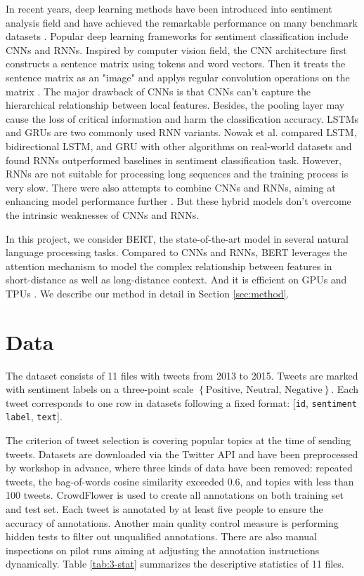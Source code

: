 \documentclass[runningheads]{llncs}
\begin{document}
In recent years, deep learning methods have been introduced into sentiment analysis field and have achieved the remarkable performance on many benchmark datasets \cite{2019sa}. Popular deep learning frameworks for sentiment classification include CNNs and RNNs. Inspired by computer vision field, the CNN architecture first constructs a sentence matrix using tokens and word vectors. Then it treats the sentence matrix as an "image" and applys regular convolution operations on the matrix \cite{cnns}. The major drawback of CNNs is that CNNs can't capture the hierarchical relationship between local features. Besides, the pooling layer may cause the loss of critical information and harm the classification accuracy. LSTMs and GRUs are two commonly used RNN variants. Nowak et al. \cite{rnns} compared LSTM, bidirectional LSTM, and GRU with other algorithms on real-world datasets and found RNNs outperformed baselines in sentiment classification task. However, RNNs are not suitable for processing long sequences and the training process is very slow. There were also attempts to combine CNNs and RNNs, aiming at enhancing model performance further \cite{com1}\cite{com2}. But these hybrid models don't overcome the intrinsic weaknesses of CNNs and RNNs.

In this project, we consider BERT, the state-of-the-art model in several natural language processing tasks. Compared to CNNs and RNNs, BERT leverages the attention mechanism to model the complex relationship between features in short-distance as well as long-distance context. And it is efficient on GPUs and TPUs \cite{bert}. We describe our method in detail in Section \ref{sec:method}.

\section{Data}
The dataset consists of 11 files with tweets from 2013 to 2015. Tweets are marked with sentiment labels on a three-point scale $\left\{ \text{Positive, Neutral, Negative} \right\}$. Each tweet corresponds to one row in datasets following a fixed format: [\texttt{id}, \texttt{sentiment label}, \texttt{text}].

The criterion of tweet selection is covering popular topics at the time of sending tweets. Datasets are downloaded via the Twitter API and have been preprocessed by workshop in advance, where three kinds of data have been removed: repeated tweets, the bag-of-words cosine similarity exceeded 0.6, and topics with less than 100 tweets. CrowdFlower is used to create all annotations on both training set and test set. Each tweet is annotated by at least five people to ensure the accuracy of annotations. Another main quality control measure is performing hidden tests to filter out unqualified annotations. There are also manual inspections on pilot runs aiming at adjusting the annotation instructions dynamically. Table \ref{tab:3-stat} summarizes the descriptive statistics of 11 files.
\end{document}

